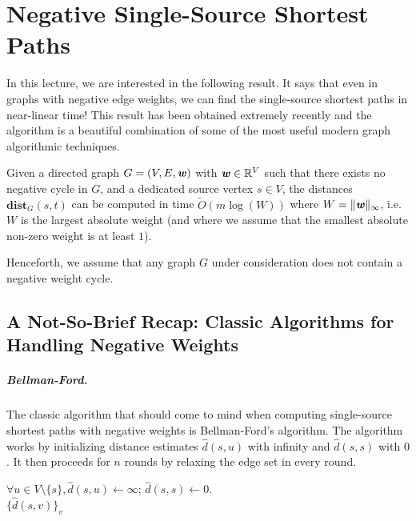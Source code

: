 
\chapter{Negative Single-Source Shortest Paths}

In this lecture, we are interested in the following result. It says that even in graphs with negative edge weights, we can find the single-source shortest paths in near-linear time! This result has been obtained extremely recently and the algorithm is a beautiful combination of some of the most useful modern graph algorithmic techniques.

\begin{theorem}\label{thm:negativeSSSPBNW}
Given a directed graph $G=(V,E, \boldsymbol{\mathit{w}})$ with $\boldsymbol{\mathit{w}} \in \mathbb{R}^V$ such that there exists no negative cycle in $G$, and a dedicated source vertex $s \in V$, the distances $\mathbf{dist}_G(s,t)$ can be computed in time $\tilde{O}(m \log(W))$ where $W = \|\boldsymbol{\mathit{w}}\|_{\infty}$, i.e. $W$ is the largest absolute weight (and where we assume that the smallest absolute non-zero weight is at least $1$).
\end{theorem}

Henceforth, we assume that any graph $G$ under consideration does not contain a negative weight cycle.

\section{A Not-So-Brief Recap: Classic Algorithms for Handling Negative Weights}

\paragraph{Bellman-Ford.} The classic algorithm that should come to mind when computing single-source shortest paths with negative weights is Bellman-Ford's algorithm. The algorithm works by initializing distance estimates $\hat{d}(s, u)$ with infinity and $\hat{d}(s,s)$ with $0$. It then proceeds for $n$ rounds by relaxing the edge set in every round. 

\begin{algorithm}
$\forall u \in V \setminus \{s\}, \hat{d}(s, u) \gets \infty$; $\hat{d}(s,s) \gets 0$.\\
\Return $\{\hat{d}(s, v) \}_v$
\caption{$\textsc{BellmanFord}(G,s)$}
\label{alg:bellmanFord}
\end{algorithm}

